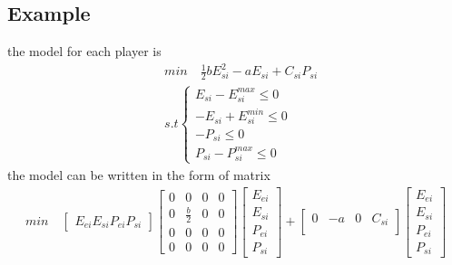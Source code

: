 \documentclass[11pt]{article} %
\begin{document}
\subsection{Example}
the model for each player  is
\begin{align}  
    &min \quad \frac{1}{2}bE_{si}^2 -aE_{si} + C_{si}P_{si}  \nonumber\\
    &s.t \begin{cases}
        E_{si} - E_{si}^{max} \leq 0\\
         -E_{si} + E_{si}^{min}\leq 0\\
         -P_{si}\leq 0\\
          P_{si} - P_{si}^{max} \leq 0
        \end{cases}
\end{align}
the model can be written in the form of matrix
\begin{align} 
    min \quad
    \begin{bmatrix}
        E_{ei}
        E_{si}
        P_{ei}
        P_{si}
    \end{bmatrix} 
    \begin{bmatrix}
        0 & 0 & 0 & 0\\
        0 & \frac{b}{2}  & 0 & 0\\
        0 & 0 & 0 & 0\\
        0 & 0 & 0 & 0
    \end{bmatrix} 
    \begin{bmatrix}
        E_{ei}\\
        E_{si}\\
        P_{ei}\\
        P_{si}
    \end{bmatrix} +
    \begin{bmatrix}
        0 & -a & 0 & C_{si}\\
    \end{bmatrix} 
    \begin{bmatrix}
        E_{ei}\\
        E_{si}\\
        P_{ei}\\
        P_{si}
    \end{bmatrix}
\end{align}
\end{document}
